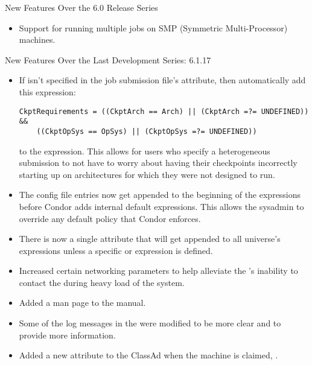 \noindent New Features Over the 6.0 Release Series
\begin{itemize}

\item Support for running multiple jobs on SMP (Symmetric Multi-Processor)
machines.

\end{itemize}

\noindent New Features Over the Last Development Series: 6.1.17
\begin{itemize}

\item If  isn't specified in the job submission file's
 attribute, then automatically add this expression:

\begin{verbatim}
CkptRequirements = ((CkptArch == Arch) || (CkptArch =?= UNDEFINED)) &&
	((CkptOpSys == OpSys) || (CkptOpSys =?= UNDEFINED))
\end{verbatim}

to the  expression. This allows for users who specify
a heterogeneous submission to not have to worry about having their checkpoints
incorrectly starting up on architectures for which they were not designed
to run.

\item The  config file entries now get
appended to the beginning of the expressions before Condor adds internal
default expressions.  This allows the sysadmin to override any default
policy that Condor enforces.

\item There is now a single  attribute
that will get appended to all universe's 
expressions unless a specific  or
 expression is defined.

\item Increased certain networking parameters to help alleviate the 
's inability to contact the  during heavy load
of the system.

\item Added a  man page to the manual.

\item Some of the log messages in the  were modified to
be more clear and to provide more information.

\item Added a new attribute to the  ClassAd when the
machine is claimed, .

\end{itemize}

